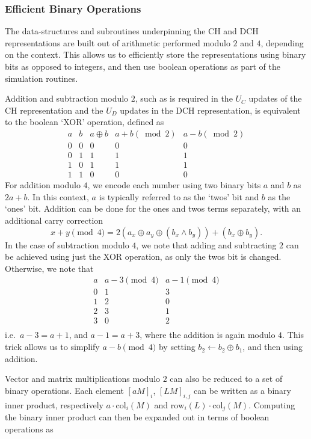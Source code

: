 \subsubsection{Efficient Binary Operations}\label{sec:binary_ops}
The data-structures and subroutines underpinning the CH and DCH representations are built out of arithmetic performed modulo $2$ and $4$, depending on the context. This allows us to efficiently store the representations using binary bits as opposed to integers, and then use boolean operations as part of the simulation routines.\par
Addition and subtraction modulo $2$, such as is required in the $U_{C}$ updates of the CH representation and the $U_{D}$ updates in the DCH representation, is equivalent to the boolean `XOR' operation, defined as
\[
\begin{array}{c|c|c|c|c}
a & b & a\oplus b & a+b\left(\bmod{2}\right)&a-b\left(\bmod{2}\right)\\
\hline
0 & 0 & 0 & 0 & 0\\
0 & 1 & 1  & 1 & 1\\
1 & 0 & 1 & 1 & 1\\
1 & 1 & 0 & 0 & 0
\end{array}
\label{eq:xor}
\]
For addition modulo $4$, we encode each number using two binary bits $a$ and $b$ as $2a+b$. In this context, $a$ is typically referred to as the `twos' bit and $b$ as the `ones' bit. Addition can be done for the ones and twos terms separately, with an additional carry correction
\[x+y\pmod{4} = 2\left(a_{x}\oplus a_{y} \oplus (b_{x}\wedge b_{y})\right) + \left(b_{x}\oplus b_{y}\right).\]
In the case of subtraction modulo $4$, we note that adding and subtracting $2$ can be achieved using just the XOR operation, as only the twos bit is changed. Otherwise, we note that
\[
\begin{array}{c|c|c}
a  & a-3 \pmod{4} & a-1\pmod{4}\\
\hline
0 & 1 & 3 \\
1 & 2 & 0 \\
2 & 3 & 1 \\
3 & 0 & 2 \\
\end{array}
\]
i.e.\ $a-3=a+1$, and $a-1=a+3$, where the addition is again modulo $4$. This trick allows us to simplify $a-b\pmod{4}$ by setting $b_{2}\gets b_{2}\oplus b_{1}$, and then using addition.\par
Vector and matrix multiplications modulo $2$ can also be reduced to a set of binary operations. Each element $[aM]_{i}$, $[LM]_{i,j}$ can be written as a binary inner product, respectively $a\cdot \text{col}_{i}(M)$ and $\text{row}_{i}(L)\cdot\text{col}_{j}(M)$. Computing the binary inner product can then be expanded out in terms of boolean operations as

